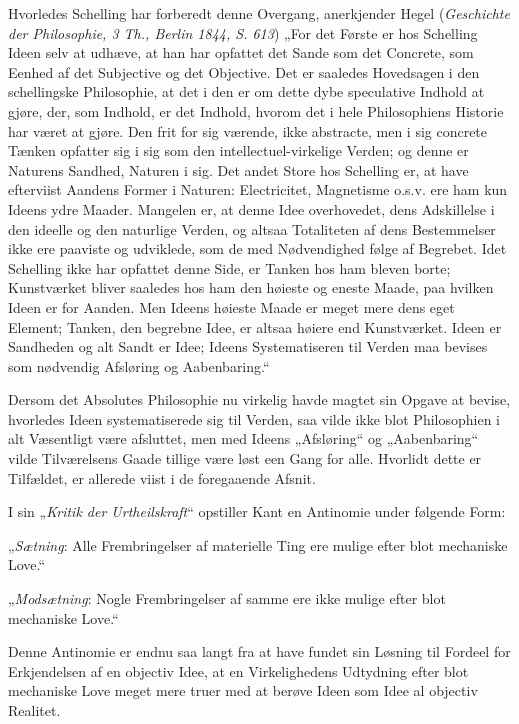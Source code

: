\documentclass[12pt]{book}
\newcommand{\opage}[1]{\marginnote{\footnotesize\textit{[#1]}}}
\begin{document}
Hvorledes Schelling har forberedt denne Overgang, anerkjender Hegel (\textit{Geschichte der
Philosophie, 3 Th., Berlin 1844, S. 613}) „For det Første er hos Schelling Ideen selv at udhæve,
at han har opfattet det Sande som det Concrete, som Eenhed af det Subjective og det Objective.
Det er saaledes Hovedsagen i den schellingske Philosophie, at det i den er om dette dybe
speculative Indhold at gjøre, der, som Indhold, er det Indhold, hvorom det i hele Philosophiens
Historie har været at gjøre. Den frit for sig værende, ikke abstracte, men i sig concrete Tænken
opfatter sig i sig som den intellectuel-virkelige Verden; og denne er Naturens Sandhed, Naturen
i sig. Det andet Store hos Schelling er, at have efterviist Aandens Former i Naturen:
Electricitet, Magnetisme o.s.v. ere ham kun Ideens ydre Maader. Mangelen er, at denne Idee
overhovedet, dens Adskillelse i den ideelle og den naturlige Verden, og altsaa Totaliteten af
dens Bestemmelser ikke ere paaviste og udviklede, som de med Nødvendighed følge af Begrebet.
Idet Schelling ikke har opfattet denne Side, er Tanken hos ham bleven borte; Kunstværket bliver
saaledes hos ham den høieste og eneste Maade, paa hvilken Ideen er for Aanden. Men Ideens
høieste Maade er meget mere dens eget Element; Tanken, den begrebne Idee, er altsaa høiere end
Kunstværket. Ideen er Sandheden og alt Sandt er Idee; Ideens Systematiseren til Verden maa
bevises som nødvendig Afsløring og Aabenbaring.“

Dersom det Absolutes Philosophie nu virkelig havde magtet sin Opgave at bevise, hvorledes Ideen
systematiserede sig til Verden, saa vilde ikke blot Philosophien i alt Væsentligt være
afsluttet, men med Ideens „Afsløring“ og „Aabenbaring“ vilde Tilværelsens Gaade tillige være
løst een Gang
\opage{123} for alle. Hvorlidt dette er Tilfældet, er allerede viist i de foregaaende Afsnit.

I sin „\textit{Kritik der Urtheilskraft}“ opstiller Kant en Antinomie under følgende Form:

„\emph{Sætning}: Alle Frembringelser af materielle Ting ere mulige efter blot mechaniske Love.“

„\emph{Modsætning}: Nogle Frembringelser af samme ere ikke mulige efter blot mechaniske Love.“

Denne Antinomie er endnu saa langt fra at have fundet sin Løsning til Fordeel for Erkjendelsen
af en objectiv Idee, at en Virkelighedens Udtydning efter blot mechaniske Love meget mere truer
med at berøve Ideen som Idee al objectiv Realitet.
\end{document}
